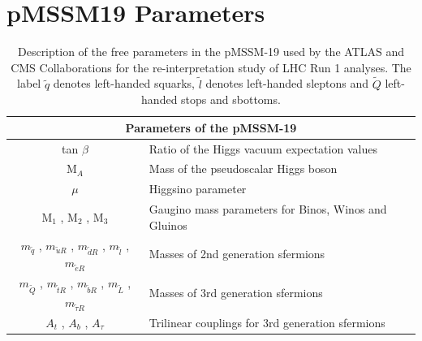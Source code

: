 \documentclass[epj,nopacs,fleqn]{svjour}
\begin{document}
\section{pMSSM19 Parameters}
\begin{table}[!h]
	\renewcommand{\arraystretch}{1.3}
	\begin{tabular}{ c | l }
		\hline
		\multicolumn{2}{c}{\large \textbf{Parameters of the pMSSM-19}} \\
		\hline \hline
		tan $\beta $ & Ratio of the Higgs vacuum expectation values \\
		M$_A$ & Mass of the pseudoscalar Higgs boson \\
		$\mu$ & Higgsino parameter \\
		M$_1$ , M$_2$ , M$_3$ & Gaugino mass parameters for Binos, Winos and Gluinos \\
		$m_{\tilde q}$ , $m_{\tilde u R}$ , $m_{\tilde d R}$ ,  $m_{\tilde l}$ ,  $m_{\tilde e R}$ & Masses of 2nd generation sfermions \\
		$m_{\tilde Q}$ , $m_{\tilde t R}$ , $m_{\tilde b R}$ , $m_{\tilde L }$ , $m_{\tilde \tau R}$ & Masses of 3rd generation sfermions \\
		$A_t$ , $A_b$ , $A_{\tau}$ & Trilinear couplings for 3rd generation sfermions \\ \hline \hline
	\end{tabular}
	\caption{Description of the free parameters in the pMSSM-19 used by the ATLAS and CMS Collaborations for the re-interpretation study of  LHC Run 1 analyses. The label $\tilde q$ denotes left-handed squarks, $\tilde l$ denotes left-handed sleptons and $\tilde Q$ left-handed stops and sbottoms.}
\end{table}
\label{tab::pMSSM}


%
%
%
%
\end{document}
